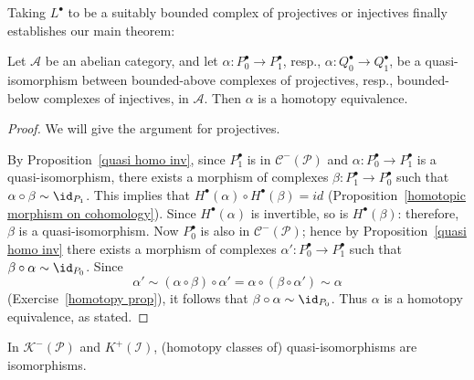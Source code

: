 Taking $L^\bullet$ to be a suitably bounded complex of projectives or injectives finally establishes our main theorem:
\begin{theorem}\label{quasi to homotopy}
Let $\mathcal{A}$ be an abelian category, and let $\alpha:P^\bullet_0\to P^\bullet_1$, resp., $\alpha:Q_0^\bullet\to Q_1^\bullet$, be a quasi-isomorphism between bounded-above complexes of projectives, resp., bounded-below complexes of injectives, in $\mathcal{A}$. Then $\alpha$ is a homotopy equivalence.
\end{theorem}
\begin{proof}
We will give the argument for projectives.\par
By Proposition~\ref{quasi homo inv}, since $P_1^\bullet$ is in $\mathcal{C}^-(\mathcal{P})$ and $\alpha:P_0^\bullet\to P_1^{\bullet}$ is a quasi-isomorphism, there exists a morphism of complexes $\beta:P_1^\bullet\to P_0^{\bullet}$ such that $\alpha\circ\beta\sim \id_{P_1}$. This implies that $H^{\bullet}(\alpha)\circ H^{\bullet}(\beta)=id$ (Proposition~\ref{homotopic morphism on cohomology}). Since $H^{\bullet}(\alpha)$ is invertible, so is $H^{\bullet}(\beta)$: therefore, $\beta$ is a quasi-isomorphism. Now $P_0^{\bullet}$ is also in $\mathcal{C}^-(\mathcal{P})$; hence by Proposition~\ref{quasi homo inv} there exists a morphism of complexes $\alpha':P_0^{\bullet}\to P_1^{\bullet}$ such that $\beta\circ\alpha\sim \id_{P_0}$. Since 
\[\alpha'\sim(\alpha\circ\beta)\circ\alpha'=\alpha\circ(\beta\circ\alpha')\sim\alpha\]
(Exercise~\ref{homotopy prop}), it follows that $\beta\circ\alpha\sim \id_{P_0}$. Thus $\alpha$ is a homotopy equivalence, as stated.
\end{proof}
\begin{corollary}
In $\mathcal{K}^-(\mathcal{P})$ and $K^+(\mathcal{I})$, (homotopy classes of) quasi-isomorphisms
are isomorphisms.
\end{corollary}

